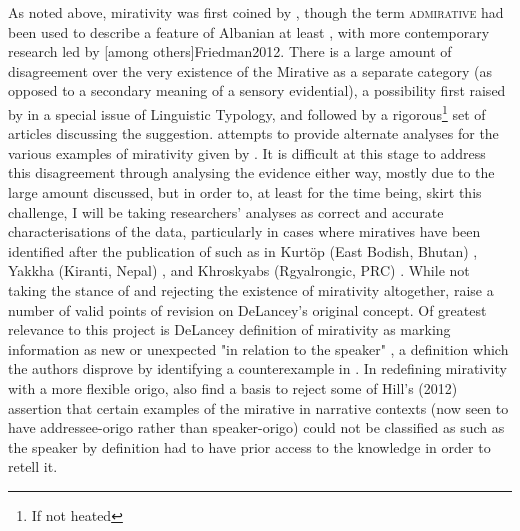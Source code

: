 As noted above, mirativity was first coined by , though the term \textsc{admirative} had been used to describe a feature of Albanian at least , with more contemporary research led by [among others]{Friedman2012}. There is a large amount of disagreement over the very existence of the Mirative as a separate category (as opposed to a secondary meaning of a sensory evidential), a possibility first raised by  in a special issue of Linguistic Typology, and followed by a rigorous\footnote{If not heated} set of articles discussing the suggestion.  attempts to provide alternate analyses for the various examples of mirativity given by . It is difficult at this stage to address this disagreement through analysing the evidence either way, mostly due to the large amount discussed, but in order to, at least for the time being, skirt this challenge, I will be taking researchers' analyses as correct and accurate characterisations of the data, particularly in cases where miratives have been identified after the publication of  such as in Kurtöp (East Bodish, Bhutan) \cite{Hyslop2017}, Yakkha (Kiranti, Nepal) \cite{Schackow2015}, and Khroskyabs (Rgyalrongic, PRC) \cites{Lai2017}{TaylorAdams2020}. While not taking the stance of  and rejecting the existence of mirativity altogether,  raise a number of valid points of revision on DeLancey's original concept. Of greatest relevance to this project is DeLancey definition of mirativity as marking information as new or unexpected "in relation to the speaker" \cite[488]{HengeveldOlbertz2012}, a definition which the authors disprove by identifying a counterexample in . In redefining mirativity with a more flexible origo,  also find a basis to reject some of Hill's (2012) assertion that certain examples of the mirative in narrative contexts (now seen to have addressee-origo rather than speaker-origo) could not be classified as such as the speaker by definition had to have prior access to the knowledge in order to retell it.


